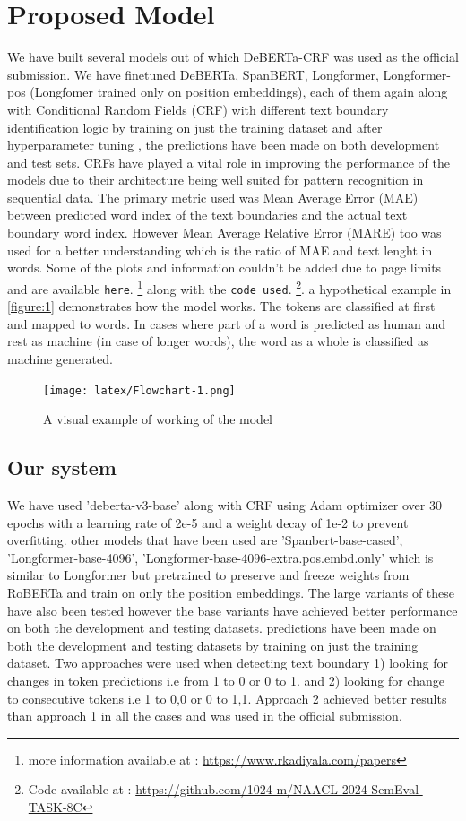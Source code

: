 \documentclass[11pt]{article}
\begin{document}
\section{Proposed Model}
We have built several models out of which DeBERTa-CRF was used as the official submission. We have finetuned DeBERTa\cite{he2023debertav3}, SpanBERT\cite{joshi2020spanbert}, Longformer\cite{beltagy2020longformer}, Longformer-pos (Longfomer trained only on position embeddings), each of them again along with Conditional Random Fields (CRF)\cite{mccallum2012efficiently} with different text boundary identification logic by training on just the training dataset and after hyperparameter tuning , the predictions have been made on both development and test sets. CRFs have played a vital role in improving the performance of the models due to their architecture being well suited for pattern recognition in sequential data. The primary metric used was Mean Average Error (MAE) between predicted word index of the text boundaries and the actual text boundary word index. However Mean Average Relative Error (MARE) too was used for a better understanding which is the ratio of MAE and text lenght in words. Some of the plots and information couldn't be added due to page limits and are available \verb|here|. \footnote{more information available at : \url{https://www.rkadiyala.com/papers}} along with the  \verb|code used|. \footnote{Code available at : \url{https://github.com/1024-m/NAACL-2024-SemEval-TASK-8C}}. a hypothetical example in \autoref{figure:1} demonstrates how the model works. The tokens are classified at first and mapped to words. In cases where part of a word is predicted as human and rest as machine (in case of longer words), the word as a whole is classified as machine generated. 
\begin{figure}[ht]
\centering
\texttt{[image: latex/Flowchart-1.png]}
\caption{A visual example of working of the model}
\label{figure:1}
\end{figure}

\subsection{Our system}
We have used 'deberta-v3-base' along with CRF using Adam\cite{kingma2017adam} optimizer over 30 epochs with a learning rate of 2e-5 and a weight decay of 1e-2 to prevent overfitting. other models that have been used are 'Spanbert-base-cased', 'Longformer-base-4096', 'Longformer-base-4096-extra.pos.embd.only' which is similar to Longformer but pretrained to preserve and freeze weights from RoBERTa\cite{liu2019roberta} and train on only the position embeddings. The large variants of these have also been tested however the base variants have achieved better performance on both the development and testing datasets. predictions have been made on both the development and testing datasets by training on just the training dataset. Two approaches were used when detecting text boundary 1) looking for changes in token predictions i.e from 1 to 0 or 0 to 1. and 2) looking for change to consecutive tokens i.e 1 to 0,0 or 0 to 1,1. Approach 2 achieved better results than approach 1 in all the cases and was used in the official submission. 
\end{document}

